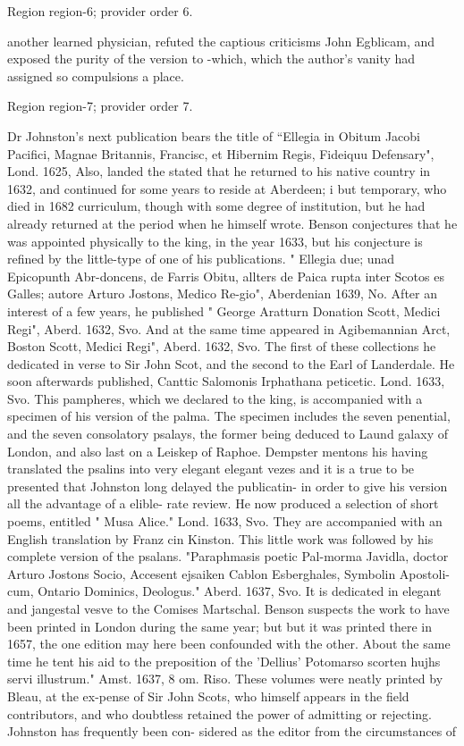 \documentclass[11pt]{article}
\begin{document}
{\scriptsize\color{gray} Region region-6; provider order 6.\par}
\medskip

another learned physician, refuted the captious criticisms John Egblicam, and exposed the purity of the version to -which, which the author's vanity had assigned so compulsions a place.
\par

{\scriptsize\color{gray} Region region-7; provider order 7.\par}
\medskip

Dr Johnston's next publication bears the title of “Ellegia in Obitum Jacobi Pacifici, Magnae Britannis, Francisc, et Hibernim Regis, Fideiquu Defensary", Lond. 1625, Also, landed the stated that he returned to his native country in 1632, and continued for some years to reside at Aberdeen; i but temporary, who died in 1682 curriculum, though with some degree of institution, but he had already returned at the period when he himself wrote. Benson conjectures that he was appointed physically to the king, in the year 1633, but his conjecture is refined by the little-type of one of his publications. " Ellegia due; unad Epicopunth Abr-doncens, de Farris Obitu, allters de Paica rupta inter Scotos es Galles; autore Arturo Jostons, Medico Re-gio", Aberdenian 1639, No. After an interest of a few years, he published " George Aratturn Donation Scott, Medici Regi", Aberd. 1632, Svo. And at the same time appeared in Agibemannian Arct, Boston Scott, Medici Regi", Aberd. 1632, Svo. The first of these collections he dedicated in verse to Sir John Scot, and the second to the Earl of Landerdale. He soon afterwards published, Canttic Salomonis Irphathana peticetic. Lond. 1633, Svo. This pampheres, which we declared to the king, is accompanied with a specimen of his version of the palma. The specimen includes the seven penential, and the seven consolatory psalays, the former being deduced to Laund galaxy of London, and also last on a Leiskep of Raphoe. Dempster mentons his having translated the psalins into very elegant elegant vezes and it is a true to be presented that Johnston long delayed the publicatin- in order to give his version all the advantage of a elible- rate review. He now produced a selection of short poems, entitled " Musa Alice." Lond. 1633, Svo. They are accompanied with an English translation by Franz cin Kinston. This little work was followed by his complete version of the psalans. "Paraphmasis poetic Pal-morma Javidla, doctor Arturo Jostons Socio, Accesent ejsaiken Cablon Esberghales, Symbolin Apostoli- cum, Ontario Dominics, Deologus." Aberd. 1637, Svo. It is dedicated in elegant and jangestal vesve to the Comises Martschal. Benson suspects the work to have been printed in London during the same year; but but it was printed there in 1657, the one edition may here been confounded with the other. About the same time he tent his aid to the preposition of the 'Dellius' Potomarso scorten hujhs servi illustrum." Amst. 1637, 8 om. Riso. These volumes were neatly printed by Bleau, at the ex-pense of Sir John Scots, who himself appears in the field contributors, and who doubtless retained the power of admitting or rejecting. Johnston has frequently been con- sidered as the editor from the circumstances of 
\end{document}
